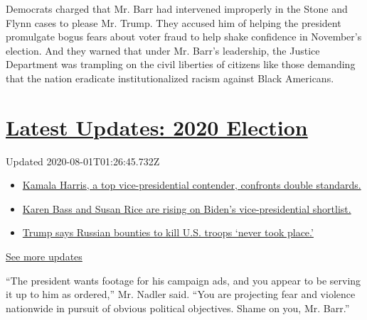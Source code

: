 Democrats charged that Mr. Barr had intervened improperly in the Stone
and Flynn cases to please Mr. Trump. They accused him of helping the
president promulgate bogus fears about voter fraud to help shake
confidence in November's election. And they warned that under Mr. Barr's
leadership, the Justice Department was trampling on the civil liberties
of citizens like those demanding that the nation eradicate
institutionalized racism against Black Americans.

\hypertarget{latest-updates-2020-election}{%
\section{\texorpdfstring{\href{https://www.nytimes.com/2020/07/31/us/elections/biden-vs-trump.html?action=click\&pgtype=Article\&state=default\&region=MAIN_CONTENT_1\&context=storylines_live_updates}{Latest
Updates: 2020
Election}}{Latest Updates: 2020 Election}}\label{latest-updates-2020-election}}

Updated 2020-08-01T01:26:45.732Z

\begin{itemize}
\tightlist
\item
  \href{https://www.nytimes.com/2020/07/31/us/elections/biden-vs-trump.html?action=click\&pgtype=Article\&state=default\&region=MAIN_CONTENT_1\&context=storylines_live_updates\#link-29fdff45}{Kamala
  Harris, a top vice-presidential contender, confronts double
  standards.}
\item
  \href{https://www.nytimes.com/2020/07/31/us/elections/biden-vs-trump.html?action=click\&pgtype=Article\&state=default\&region=MAIN_CONTENT_1\&context=storylines_live_updates\#link-13ec3d9c}{Karen
  Bass and Susan Rice are rising on Biden's vice-presidential
  shortlist.}
\item
  \href{https://www.nytimes.com/2020/07/31/us/elections/biden-vs-trump.html?action=click\&pgtype=Article\&state=default\&region=MAIN_CONTENT_1\&context=storylines_live_updates\#link-49e9a016}{Trump
  says Russian bounties to kill U.S. troops `never took place.'}
\end{itemize}

\href{https://www.nytimes.com/2020/07/31/us/elections/biden-vs-trump.html?action=click\&pgtype=Article\&state=default\&region=MAIN_CONTENT_1\&context=storylines_live_updates}{See
more updates}

``The president wants footage for his campaign ads, and you appear to be
serving it up to him as ordered,'' Mr. Nadler said. ``You are projecting
fear and violence nationwide in pursuit of obvious political objectives.
Shame on you, Mr. Barr.''

